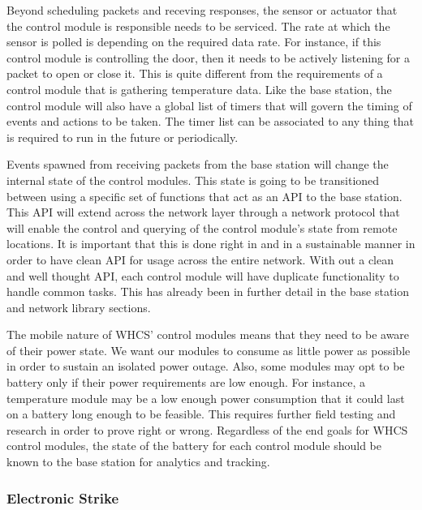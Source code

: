 
Beyond scheduling packets and receving responses, the sensor or actuator that
the control module is responsible needs to be serviced. The rate at which the
sensor is polled is depending on the required data rate. For instance, if this
control module is controlling the door, then it needs to be actively listening
for a packet to open or close it. This is quite different from the requirements
of a control module that is gathering temperature data. Like the base station,
the control module will also have a global list of timers that will govern the
timing of events and actions to be taken. The timer list can be associated to
any thing that is required to run in the future or periodically.

Events spawned from receiving packets from the base station will change the
internal state of the control modules. This state is going to be transitioned
between using a specific set of functions that act as an API to the base
station. This API will extend across the network layer through a network
protocol that will enable the control and querying of the control module's state
from remote locations. It is important that this is done right in and in a
sustainable manner in order to have clean API for usage across the entire
network. With out a clean and well thought API, each control module will have
duplicate functionality to handle common tasks. This has already been in
further detail in the base station and network library sections.

The mobile nature of WHCS' control modules means that they need to be aware of
their power state. We want our modules to consume as little power as possible
in order to sustain an isolated power outage. Also, some modules may opt to be
battery only if their power requirements are low enough. For instance, a
temperature module may be a low enough power consumption that it could last on
a battery long enough to be feasible. This requires further field testing and
research in order to prove right or wrong. Regardless of the end goals for WHCS
control modules, the state of the battery for each control module should be
known to the base station for analytics and tracking.

\subsubsection{Electronic Strike}

